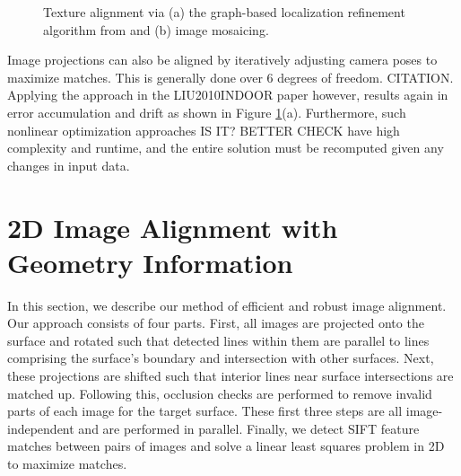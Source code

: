 \documentclass[]{spie}  %
\begin{document}
\begin{figure}
  \centering

  \centering {}
  \caption{Texture alignment via (a) the graph-based localization
    refinement algorithm from \cite{chen2010indoor} and (b) image
    mosaicing.}
  \label{fig:mosaic3D}
\end{figure}

Image projections can also be aligned by iteratively adjusting camera
poses to maximize matches. This is generally done over 6 degrees of
freedom. CITATION. Applying the approach in the LIU2010INDOOR paper
however, results again in error accumulation and drift as shown in
Figure \ref{fig:mosaic3D}(a). Furthermore, such nonlinear optimization
approaches IS IT? BETTER CHECK have high complexity and runtime, and the
entire solution must be recomputed given any changes in input data.


\section{2D Image Alignment with Geometry Information}
\label{sec:2dAlignment}
In this section, we describe our method of efficient and robust image
alignment. Our approach consists of four parts. First, all images are
projected onto the surface and rotated such that detected lines within
them are parallel to lines comprising the surface's boundary and
intersection with other surfaces. Next, these projections are shifted
such that interior lines near surface intersections are matched
up. Following this, occlusion checks are performed to remove invalid
parts of each image for the target surface. These first three steps
are all image-independent and are performed in parallel. Finally, we
detect SIFT feature matches between pairs of images and solve a linear
least squares problem in 2D to maximize matches.
\end{document}
